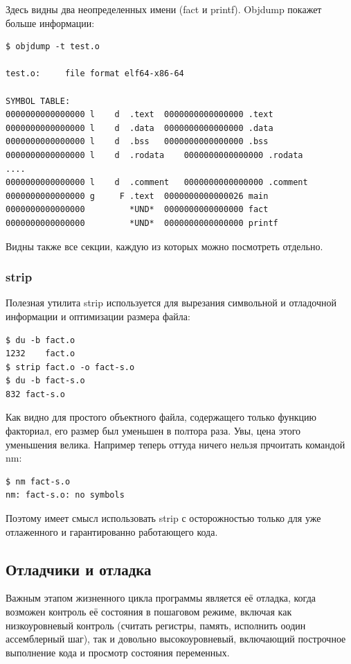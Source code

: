 \documentclass[a4paper,12pt,oneside]{article}
\begin{document}
Здесь видны два неопределенных имени (fact и printf). Objdump покажет больше информации:

\begin{verbatim}
$ objdump -t test.o

test.o:     file format elf64-x86-64

SYMBOL TABLE:
0000000000000000 l    d  .text	0000000000000000 .text
0000000000000000 l    d  .data	0000000000000000 .data
0000000000000000 l    d  .bss	0000000000000000 .bss
0000000000000000 l    d  .rodata	0000000000000000 .rodata
....
0000000000000000 l    d  .comment	0000000000000000 .comment
0000000000000000 g     F .text	0000000000000026 main
0000000000000000         *UND*	0000000000000000 fact
0000000000000000         *UND*	0000000000000000 printf
\end{verbatim}

Видны также все секции, каждую из которых можно посмотреть отдельно.

\subsubsection{strip}\label{subsubsec:Strip} 

Полезная утилита strip используется для вырезания символьной и отладочной информации и оптимизации размера файла:

\begin{verbatim}
$ du -b fact.o
1232	fact.o
$ strip fact.o -o fact-s.o
$ du -b fact-s.o
832	fact-s.o
\end{verbatim}

Как видно для простого объектного файла, содержащего только функцию факториал, его размер был уменьшен в полтора раза. Увы, цена этого уменьшения велика. Например теперь оттуда ничего нельзя прчоитать командой nm:

\begin{verbatim}
$ nm fact-s.o
nm: fact-s.o: no symbols
\end{verbatim}

Поэтому имеет смысл использовать strip с осторожностью только для уже отлаженного и гарантированно работающего кода.

\subsection{Отладчики и отладка}\label{subsec:Debugger}

Важным этапом жизненного цикла программы является её отладка, когда возможен контроль её состояния в пошаговом режиме, включая как низкоуровневый контроль (считать регистры, память, исполнить оодин ассемблерный шаг), так и довольно высокоуровневый, включающий построчное выполнение кода и просмотр состояния переменных.
\end{document}
